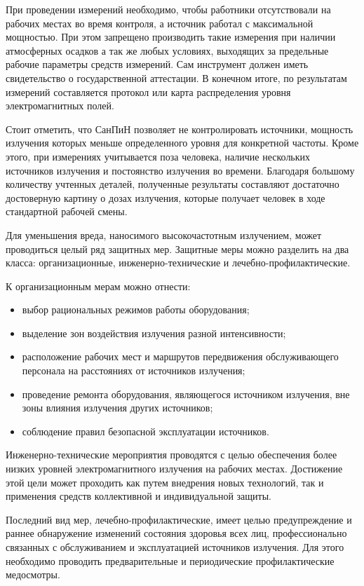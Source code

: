 При проведении измерений необходимо, чтобы работники отсутствовали на рабочих местах
во время контроля, а источник работал с максимальной мощностью. При этом запрещено
производить такие измерения при наличии атмосферных осадков а так же любых 
условиях, выходящих за предельные рабочие параметры средств измерений.
Сам инструмент должен иметь свидетельство о государственной аттестации.
В конечном итоге, по результатам измерений составляется протокол или карта распределения 
уровня электромагнитных полей.

Стоит отметить, что СанПиН позволяет не контролировать источники, мощность излучения 
которых меньше определенного уровня для конкретной частоты.
Кроме этого, при измерениях учитывается поза человека, наличие нескольких источников
излучения и постоянство излучения во времени. Благодаря большому количеству
учтенных деталей, полученные результаты составляют достаточно достоверную картину 
о дозах излучения, которые получает человек в ходе стандартной рабочей смены.

Для уменьшения вреда, наносимого высокочастотным излучением, может проводиться целый 
ряд защитных мер. Защитные меры можно разделить на два класса: организационные, 
инженерно-технические и лечебно-профилактические.

К организационным мерам можно отнести:
\begin{itemize}
    \item выбор рациональных режимов работы оборудования;
    \item выделение зон воздействия излучения разной интенсивности;
    \item расположение рабочих мест и маршрутов передвижения обслуживающего персонала на 
    расстояниях от источников излучения;
    \item проведение ремонта оборудования, являющегося источником излучения, вне зоны влияния 
    излучения других источников;
    \item соблюдение правил безопасной эксплуатации источников.
\end{itemize}

Инженерно-технические мероприятия проводятся с целью обеспечения более низких
уровней электромагнитного излучения на рабочих местах. Достижение этой цели может 
проходить как путем внедрения новых технологий, так и применения средств коллективной и индивидуальной защиты.

Последний вид мер, лечебно-профилактические, имеет целью предупреждение и раннее
обнаружение изменений состояния здоровья всех лиц, профессионально связанных с 
обслуживанием и эксплуатацией источников излучения. Для этого необходимо проводить
предварительные и периодические профилактические медосмотры.

